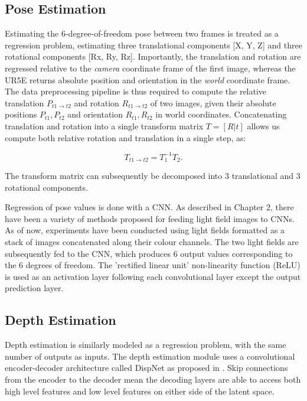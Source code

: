 \documentclass[openany]{book}
\begin{document}
\subsection{Pose Estimation}

Estimating the 6-degree-of-freedom pose between two frames is treated as a regression problem, estimating three translational components [X, Y, Z] and three rotational components [Rx, Ry, Rz]. Importantly, the translation and rotation are regressed relative to the \textit{camera} coordinate frame of the first image, whereas the UR5E returns absolute position and orientation in the \textit{world} coordinate frame. The data preprocessing pipeline is thus required to compute the relative translation $P_{t1 \rightarrow t2}$ and rotation $R_{t1 \rightarrow t2}$ of two images, given their absolute positions $P_{t1}, P_{t2}$ and orientation $R_{t1}, R_{t2}$ in world coordinates. Concatenating translation and rotation into a single transform matrix $T = [R|t]$ allows us compute both relative rotation and translation in a single step, as:

\begin{equation}
T_{t1 \rightarrow t2} = T_1^{-1} T_2.
\end{equation}

The transform matrix can subsequently be decomposed into 3 translational and 3 rotational components. 

Regression of pose values is done with a CNN. As described in Chapter 2, there have been a variety of methods proposed for feeding light field images to CNNs. As of now, experiments have been conducted using light fields formatted as a stack of images concatenated along their colour channels. The two light fields are subsequently fed to the CNN, which produces 6 output values corresponding to the 6 degrees of freedom. The 'rectified linear unit' non-linearity function (ReLU) is used as an activation layer following each convolutional layer except the output prediction layer. 


\subsection{Depth Estimation}

Depth estimation is similarly modeled as a regression problem, with the same number of outputs as inputs. The depth estimation module uses a convolutional encoder-decoder architecture called DispNet as proposed in \cite{mayer2015dispnet}. Skip connections from the encoder to the decoder mean the decoding layers are able to access both high level features and low level features on either side of the latent space.
\end{document}
